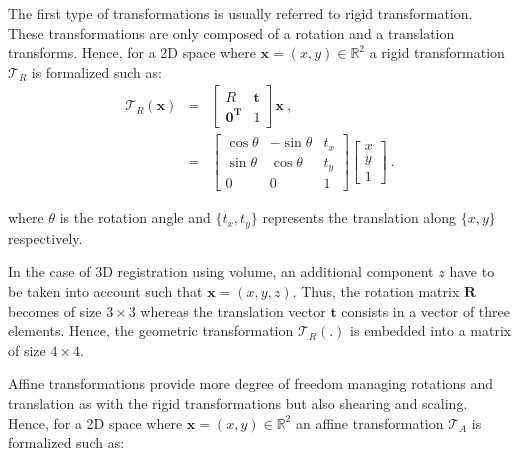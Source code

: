 The first type of transformations is usually referred to rigid transformation. These transformations are only composed of a rotation and a translation transforms. Hence, for a 2D space where $\mathbf{x} = (x,y) \in \mathbb{R}^2$ a rigid transformation $\mathcal{T}_R$ is formalized such as:
\begin{eqnarray}
	\mathcal{T}_R(\mathbf{x}) & = & \begin{bmatrix}
		R & \mathbf{t} \\
		\mathbf{0^T} & 1
	\end{bmatrix} \mathbf{x} \ , \nonumber \\
	& = & \begin{bmatrix}
		\cos \theta & -\sin \theta & t_x \\
		\sin \theta & \cos \theta & t_y \\
		0 & 0 & 1
	\end{bmatrix}\begin{bmatrix}
		x \\
		y \\
		1
	\end{bmatrix} \ . \label{eq:rigtra} %
\end{eqnarray}

\noindent where $\theta$ is the rotation angle and $\{ t_x,t_y \}$ represents the translation along $\{x,y\}$ respectively.

In the case of 3D registration using volume, an additional component $z$ have to be taken into account such that $\mathbf{x} = (x,y,z)$. Thus, the rotation matrix $\mathbf{R}$ becomes of size $3 \times 3$ whereas the translation vector $\mathbf{t}$ consists in a vector of three elements. Hence, the geometric transformation $\mathcal{T}_R(.)$ is embedded into a matrix of size $4 \times 4$.

Affine transformations provide more degree of freedom managing rotations and translation as with the rigid transformations but also shearing and scaling. Hence, for a 2D space where $\mathbf{x} = (x,y) \in \mathbb{R}^2$ an affine transformation $\mathcal{T}_A$ is formalized such as: 

